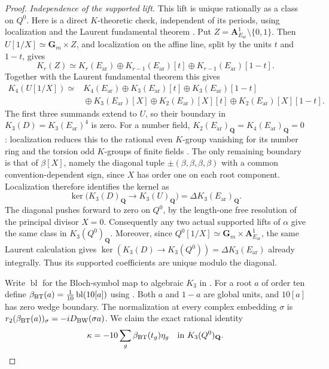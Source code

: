 \begin{proof}
\emph{Independence of the supported lift.}
This lift is unique rationally as a class on $Q^0$.
Here is a direct $K$-theoretic check, independent of its periods,
using localization and the Laurent fundamental theorem \cite{Weibel}.
Put $Z=\mathbf A^1_{E_{\mathrm{ar}}}\setminus\{0,1\}$.  Then
$U[1/X]\simeq\mathbf G_m\times Z$, and localization on the
affine line, split by the units $t$ and $1-t$, gives
\[
 K_r(Z)\simeq K_r(E_{\mathrm{ar}})\oplus
       K_{r-1}(E_{\mathrm{ar}})[t]\oplus K_{r-1}(E_{\mathrm{ar}})[1-t].
\]
Together with the Laurent fundamental theorem this gives
\[
\begin{split}
 K_4(U[1/X])\simeq{}&
 K_4(E_{\mathrm{ar}})\oplus K_3(E_{\mathrm{ar}})[t]\oplus K_3(E_{\mathrm{ar}})[1-t]\\
 &{}\oplus K_3(E_{\mathrm{ar}})[X]
 \oplus K_2(E_{\mathrm{ar}})[X][t]\oplus K_2(E_{\mathrm{ar}})[X][1-t].
\end{split}
\]
The first three summands extend to $U$, so their boundary in
$K_3(D)=K_3(E_{\mathrm{ar}})^4$ is zero.  For a number field,
$K_2(E_{\mathrm{ar}})_{\mathbf Q}=K_4(E_{\mathrm{ar}})_{\mathbf Q}=0$: localization
reduces this to the rational even $K$-group vanishing for its
number ring \cite[Proposition~12.2]{Borel} and the torsion odd
$K$-groups of finite fields
\cite{QuillenFinite}\cite[IV, Corollary~1.13]{Weibel}.
The only remaining boundary is that of
$\beta[X]$, namely the diagonal tuple
$\pm(\beta,\beta,\beta,\beta)$ with a common convention-dependent
sign, since $X$ has order one on each root component. Localization therefore
identifies the kernel as
\[
 \ker\bigl(K_3(D)_{\mathbf Q}\longrightarrow K_3(U)_{\mathbf Q}\bigr)
       =\Delta K_3(E_{\mathrm{ar}})_{\mathbf Q}.
\]
The diagonal pushes forward to zero on $Q^0$, by the
length-one free resolution of the principal divisor $X=0$.
Consequently any two actual supported lifts of $\alpha$ give
the same class in $K_3(Q^0)_{\mathbf Q}$.
Moreover, since
$Q^0[1/X]\simeq\mathbf G_m\times\mathbf A^1_{E_{\mathrm{ar}}}$, the same
Laurent calculation gives
$\ker(K_3(D)\to K_3(Q^0))=\Delta K_3(E_{\mathrm{ar}})$ already integrally.
Thus its supported coefficients are unique modulo the diagonal.

Write $\operatorname{bl}$ for the Bloch-symbol map to algebraic
$K_3$ in \cite[Theorem~4.9]{BunkeTamme}. For a root $a$ of order ten define
$\beta_{\rm BT}(a)=\frac1{10}\operatorname{bl}(10[a])$
using \cite[Theorem~4.9 and (4.8)]{BunkeTamme}. Both $a$ and
$1-a$ are global units, and $10[a]$ has zero wedge boundary.
The normalization at every complex embedding $\sigma$ is
$r_2(\beta_{\rm BT}(a))_\sigma=-iD_{\rm BW}(\sigma a)$.
We claim the exact rational identity
\begin{equation}\label{d2ext:dimtwoUniversalCoefficients}
 \kappa=-10\sum_g\beta_{\rm BT}(t_g)\eta_g
          \quad\hbox{in }K_3(Q^0)_{\mathbf Q}.
\end{equation}


\end{proof}
